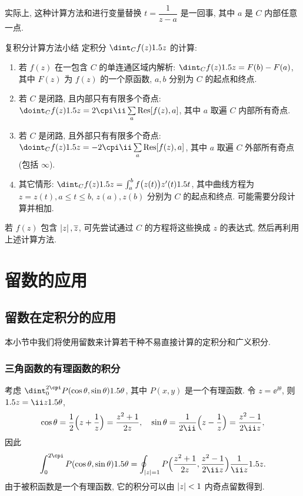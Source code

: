 实际上, 这种计算方法和进行变量替换 $t=\dfrac1{z-a}$ 是一回事, 其中 $a$ 是 $C$ 内部任意一点.

\begin{fifth}{复积分计算方法小结}
  定积分 $\dint_Cf(z)\d z$ 的计算:
  \begin{enumerate}
    \item 若 $f(z)$ 在一包含 $C$ 的单连通区域内解析: 
    $\dint_C f(z)\d z=F(b)-F(a)$, 
    其中 $F(z)$ 为 $f(z)$ 的一个原函数, $a,b$ 分别为 $C$ 的起点和终点.
    \item 若 $C$ 是闭路, 且内部只有有限多个奇点: 
    $\doint_C f(z)\d z=2\cpi\ii\suml_a \Res[f(z),a]$, 
    其中 $a$ 取遍 $C$ 内部所有奇点.
    \item 若 $C$ 是闭路, 且外部只有有限多个奇点: 
    $\doint_C f(z)\d z=-2\cpi\ii\suml_a \Res[f(z),a]$, 
    其中 $a$ 取遍 $C$ 外部所有奇点(包括 $\infty$).
    \item 其它情形: 
    $\dint_Cf(z)\d z=\int_a^b f\bigl(z(t)\bigr)z'(t)\d t$, 
    其中曲线方程为 $z=z(t),a\le t\le b$, $z(a),z(b)$ 分别为 $C$ 的起点和终点. 可能需要分段计算并相加.
  \end{enumerate}
\end{fifth}

若 $f(z)$ 包含 $\left|z\right|,\overline z$, 可先尝试通过 $C$ 的方程将这些换成 $z$ 的表达式, 然后再利用上述计算方法.



\section{留数的应用}

\subsection{留数在定积分的应用}

本小节中我们将使用留数来计算若干种不易直接计算的定积分和广义积分.

\subsubsection{三角函数的有理函数的积分}

考虑 $\dint_0^{2\cpi} P(\cos\theta,\sin\theta)\d\theta$, 其中 $P(x,y)$ 是一个有理函数.
令 $z=\ee^{\ii \theta}$, 则 $\d z=\ii z\d\theta$,
\[
   \cos\theta
  =\half\Bigl(z+\frac1z\Bigr)
  =\frac{z^2+1}{2z},\quad
  \sin\theta
  =\frac1{2\ii}\Bigl(z-\frac1z\Bigr)
  =\frac{z^2-1}{2\ii z},
\]
因此
\begin{equation}
  \label{eq:rational-function-sin-cos}
   \int_0^{2\cpi} P(\cos\theta,\sin\theta)\d\theta
  =\oint_{\abs{z}=1} P\Bigl(\frac{z^2+1}{2z},\frac{z^2-1}{2\ii z}\Bigr)\frac1{\ii z}\d z.
\end{equation}
由于被积函数是一个有理函数, 它的积分可以由 $\left|z\right|<1$ 内奇点留数得到.

